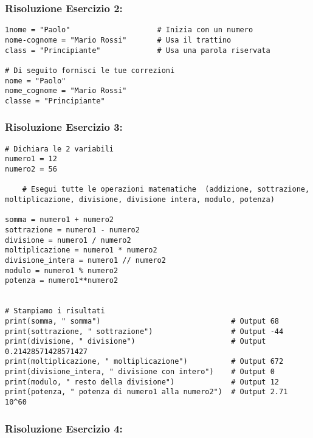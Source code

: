 \subsubsection{Risoluzione Esercizio 2: \textit{}}

\begin{lstlisting}
1nome = "Paolo"                    # Inizia con un numero
nome-cognome = "Mario Rossi"       # Usa il trattino
class = "Principiante"             # Usa una parola riservata

# Di seguito fornisci le tue correzioni
nome = "Paolo"          
nome_cognome = "Mario Rossi"
classe = "Principiante"
\end{lstlisting}

\vspace{0.3cm}

\subsubsection{Risoluzione Esercizio 3: \textit{}}

\begin{lstlisting}
# Dichiara le 2 variabili
numero1 = 12
numero2 = 56

    # Esegui tutte le operazioni matematiche  (addizione, sottrazione, moltiplicazione, divisione, divisione intera, modulo, potenza)

somma = numero1 + numero2
sottrazione = numero1 - numero2
divisione = numero1 / numero2
moltiplicazione = numero1 * numero2
divisione_intera = numero1 // numero2 
modulo = numero1 % numero2
potenza = numero1**numero2


# Stampiamo i risultati 
print(somma, " somma")                              # Output 68
print(sottrazione, " sottrazione")                  # Output -44
print(divisione, " divisione")                      # Output 0.21428571428571427
print(moltiplicazione, " moltiplicazione")          # Output 672
print(divisione_intera, " divisione con intero")    # Output 0
print(modulo, " resto della divisione")             # Output 12
print(potenza, " potenza di numero1 alla numero2")  # Output 2.71 10^60
\end{lstlisting}


\vspace{0.3cm}

\subsubsection{Risoluzione Esercizio 4: \textit{}}


